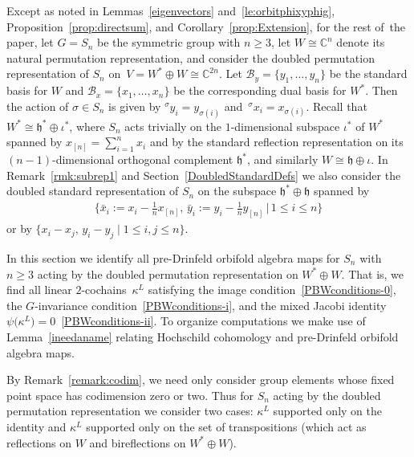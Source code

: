\documentclass[10pt,a4paper]{amsart}
\numberwithin{equation}{section}
\newcommand{\actby}[1]{{}^{#1}}
\begin{document}
Except as noted in Lemmas~\ref{eigenvectors} and~\ref{le:orbitphixyphig}, Proposition~\ref{prop:directsum},
and Corollary~\ref{prop:Extension}, for the rest of~the paper,
let $G=S_n$ be the symmetric group with $n\geq 3$, let
$W \cong \mathbb{C}^n$ denote its natural permutation representation, and
consider the doubled permutation representation of $S_n$ on~$V=W^* \oplus W\cong \mathbb{C}^{2n}$.
Let $\mathcal{B}_y=\{y_1,\dots,y_n\}$ be the standard basis for $W$ and
$\mathcal{B}_x=\{x_1,\dots,x_n\}$ be the corresponding dual basis for $W^*$. Then the action
of $\sigma \in S_n$ is given by $\actby{\sigma}y_i=y_{\sigma(i)}$ and~$\actby{\sigma}x_i=x_{\sigma(i)}$. Recall that $W^* \cong \mathfrak{h}^* \oplus \iota^*$,
where $S_n$ acts trivially on the $1$-dimensional subspace $\iota^*$ of $W^*$
spanned by $x_{[n]}=\sum\limits_{i=1}^n x_i$ and by the standard reflection
representation on its $(n-1)$-dimensional orthogonal complement $\mathfrak{h}^*$,
and similarly $W \cong \mathfrak{h} \oplus \iota$.
In Remark~\ref{rmk:subrep1} and Section~\ref{DoubledStandardDefs} we also
consider the doubled standard representation of $S_n$ on the
subspace $\mathfrak{h}^* \oplus \mathfrak{h}$ spanned by{\samepage
\begin{gather}
\label{xbar}
\bigg\{\bar{x}_i:=x_i-\frac{1}{n}x_{[n]},\,\bar{y}_i:=y_i-\frac{1}{n}y_{[n]} \,\bigg|\, 1 \leq i \leq n\bigg\}
\end{gather}
or by $\{x_i-x_j,\, y_i-y_j \mid 1 \leq i,j \leq n\}$.}

In this section we identify all pre-Drinfeld orbifold algebra maps for $S_n$ with $n \geq 3$ acting by the doubled permutation representation on $W^*\oplus W$.
That is, we find all linear $2$-cochains~$\kappa^L$
satisfying the image condition~\eqref{PBWconditions-0}, the $G$-invariance condition~\eqref{PBWconditions-i}, and the mixed Jacobi identity $\psi\big(\kappa^L\big)=0$~\eqref{PBWconditions-ii}. To organize computations we make use of Lemma~\ref{ineedaname} relating Hochschild cohomology
and pre-Drinfeld orbifold algebra maps.

By Remark~\ref{remark:codim}, we need only consider group elements whose fixed point space has codimension zero or two.
Thus for $S_n$ acting by the doubled permutation representation we consider two cases: $\kappa^L$ supported only on the identity
and $\kappa^L$ supported only on the set of transpositions (which act as reflections on $W$ and bireflections on $W^*\oplus W$).
\end{document}
